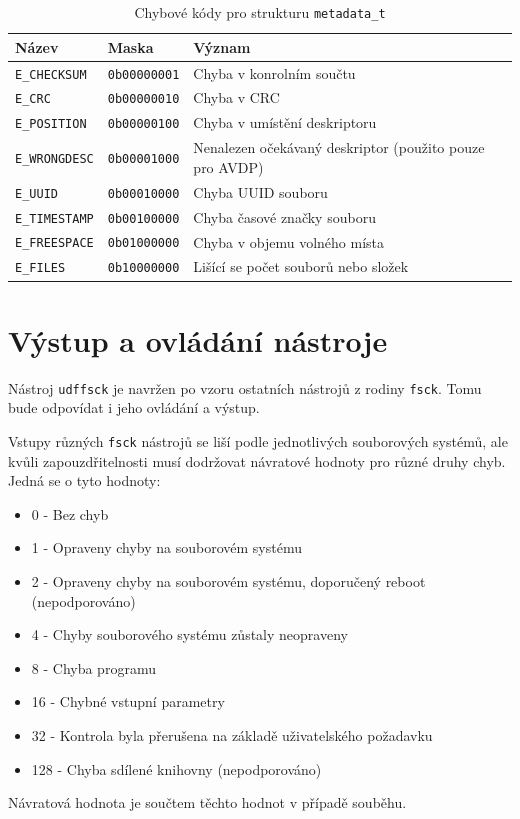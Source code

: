 \begin{table}
    \begin{tabular}{ | l | l | l | }
        \hline
        Název & Maska & Význam \\ \hline\hline
        \texttt{E\_CHECKSUM} & \texttt{0b00000001} & Chyba v konrolním součtu \\ \hline
        \texttt{E\_CRC}      & \texttt{0b00000010} & Chyba v CRC \\ \hline
        \texttt{E\_POSITION} & \texttt{0b00000100} & Chyba v umístění deskriptoru\\ \hline
        \texttt{E\_WRONGDESC}& \texttt{0b00001000} & Nenalezen očekávaný deskriptor (použito pouze pro AVDP)\\ \hline
        \texttt{E\_UUID}     & \texttt{0b00010000} & Chyba UUID souboru \\ \hline
        \texttt{E\_TIMESTAMP}& \texttt{0b00100000} & Chyba časové značky souboru\\ \hline
        \texttt{E\_FREESPACE}& \texttt{0b01000000} & Chyba v objemu volného místa\\ \hline
        \texttt{E\_FILES}    & \texttt{0b10000000} & Lišící se počet souborů nebo složek\\ \hline
    \end{tabular}
    \caption{Chybové kódy pro strukturu \texttt{metadata\_t}\label{tab:E-codes}}
\end{table}

\section{Výstup a ovládání nástroje}
Nástroj \texttt{udffsck} je navržen po vzoru ostatních nástrojů z rodiny \texttt{fsck}. Tomu bude odpovídat i jeho ovládání a výstup.

Vstupy různých \texttt{fsck} nástrojů se liší podle jednotlivých souborových systémů, ale kvůli zapouzdřitelnosti musí dodržovat návratové hodnoty pro různé druhy chyb. Jedná se o tyto hodnoty:
\begin{itemize}
    \item 0 - Bez chyb 
    \item 1 - Opraveny chyby na souborovém systému
    \item 2 - Opraveny chyby na souborovém systému, doporučený reboot (nepodporováno) 
    \item 4 - Chyby souborového systému zůstaly neopraveny
    \item 8 - Chyba programu
    \item 16 - Chybné vstupní parametry
    \item 32 - Kontrola byla přerušena na základě uživatelského požadavku
    \item 128 - Chyba sdílené knihovny (nepodporováno)
\end{itemize}
Návratová hodnota je součtem těchto hodnot v případě souběhu.

